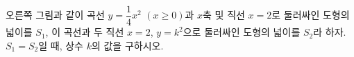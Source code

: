 \noindent\begin{minipage}[t]{0.58\linewidth}\vspace{0pt}\raggedright 오른쪽 그림과 같이 곡선 $y=\dfrac{1}{4}x^2$ $(x\ge 0)$과 $x$축 및 직선 $x=2$로 둘러싸인 도형의 넓이를 $S_1$, 이 곡선과 두 직선 $x=2$, $y=k^2$으로 둘러싸인 도형의 넓이를 $S_2$라 하자. $S_1=S_2$일 때, 상수 $k$의 값을 구하시오. \end{minipage}\hfill\begin{minipage}[t]{0.4\linewidth}\vspace{0pt}\centering \resizebox{\ifdim\width>\linewidth\linewidth\else\width\fi}{!}{}\end{minipage}\par
